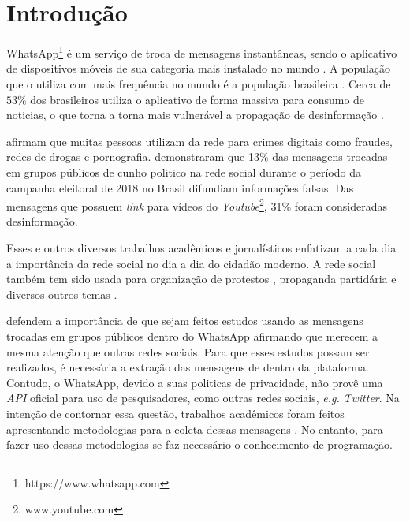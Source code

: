 \chapter{Introdução}

WhatsApp\footnote{https://www.whatsapp.com} é um serviço de troca de mensagens instantâneas, sendo o aplicativo de dispositivos móveis de sua categoria mais instalado no mundo \cite{sevitt2018}. A população que o utiliza com mais frequência no mundo é a população brasileira \cite{newman2019reuters}. Cerca de $53\%$ dos brasileiros utiliza o aplicativo de forma massiva para consumo de noticias, o que torna a torna mais vulnerável a propagação de desinformação \cite{newman2019reuters}.

 afirmam que muitas pessoas utilizam da rede para crimes digitais como fraudes, redes de drogas e pornografia.  demonstraram que 13\% das mensagens trocadas em grupos públicos de cunho politico na rede social durante o período da campanha eleitoral de 2018 no Brasil difundiam informações falsas. Das mensagens que possuem \textit{link} para vídeos do \textit{Youtube}\footnote{www.youtube.com}, 31\% foram consideradas desinformação.


Esses e outros diversos trabalhos acadêmicos e jornalísticos enfatizam a cada dia a importância da rede social no dia a dia do cidadão moderno. A rede social também tem sido usada para organização de protestos \cite{tardaguila2019epoca, resende2018system}, propaganda partidária \cite{machado2019study} e diversos outros temas \cite{garimella2018whatapp}.

 defendem a importância de que sejam feitos estudos usando as mensagens trocadas em grupos públicos dentro do WhatsApp afirmando que merecem a mesma atenção que outras redes sociais. Para que esses estudos possam ser realizados, é necessária a extração das mensagens de dentro da plataforma. Contudo, o WhatsApp, devido a suas politicas de privacidade, não provê uma \textit{API} oficial para uso de pesquisadores, como outras redes sociais, \textit{e.g.} \textit{Twitter}. Na intenção de contornar essa questão, trabalhos acadêmicos foram feitos apresentando metodologias para a coleta dessas mensagens \cite{garimella2018whatapp, resende2018system}. No entanto, para fazer uso dessas metodologias se faz necessário o conhecimento de programação.


